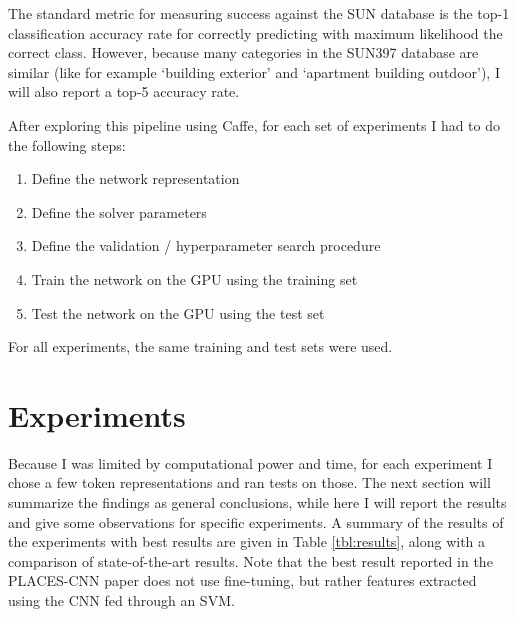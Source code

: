 \documentclass[10pt]{article}
\begin{document}
The standard metric for measuring success against the SUN database is the top-1 classification accuracy rate for correctly predicting with maximum likelihood the correct class. However, because many categories in the SUN397 database are similar (like for example `building exterior' and `apartment building outdoor'), I will also report a top-5 accuracy rate.

After exploring this pipeline using Caffe, for each set of experiments I had to do the following steps: 

\begin{enumerate}
	\item Define the network representation
	\item Define the solver parameters
	\item Define the validation / hyperparameter search procedure
	\item Train the network on the GPU using the training set
	\item Test the network on the GPU using the test set
\end{enumerate}

For all experiments, the same training and test sets were used. 

\section{Experiments}

Because I was limited by computational power and time, for each experiment I chose a few token representations and ran tests on those. The next section will summarize the findings as general conclusions, while here I will report the results and give some observations for specific experiments. A summary of the results of the experiments with best results are given in Table \ref{tbl:results}, along with a comparison of state-of-the-art results. Note that the best result reported in the PLACES-CNN paper \cite{zhou_learning_2014} does not use fine-tuning, but rather features extracted using the CNN fed through an SVM.

\begin{table}[!ht]
\centering
{}
\caption{Summary of top-1 and top-5 accuracy results on the test set}
\label{tbl:results}
\end{table}
\end{document}
